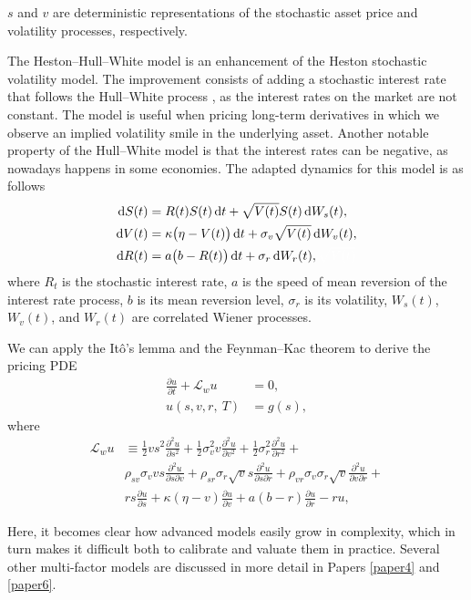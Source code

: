 \documentclass{UUThesisTemplate}
\begin{document}
$s$ and $v$ are deterministic representations of the stochastic asset price and volatility processes, respectively.
\par The Heston--Hull--White model is an enhancement of the Heston stochastic volatility model. The improvement consists of adding a stochastic interest rate that follows the Hull--White process \cite{hull1990pricing}, as the interest rates on the market are not constant. The model is useful when pricing long-term derivatives in which we observe an implied volatility smile in the underlying asset. Another notable property of the Hull--White model is that the interest rates can be negative, as nowadays happens in some economies. The adapted dynamics for this model is as follows
\begin{align}
\dif S(t) & =  R(t)S(t)\dif t + \sqrt{V(t)}S(t)\dif W_s(t), \label{hhwSDE1} \\
\dif V(t) & =  \kappa\big(\eta-V(t)\big)\dif t + \sigma_v \sqrt{V(t)}\dif W_v(t), \label{hhwSDE2} \\
\dif R(t) & = a\big(b-R(t)\big)\dif t + \sigma_r\dif W_r(t), {\color{white} \sqrt{V(t)}} \label{hhwSDE3}
\end{align}
where $R_t$ is the stochastic interest rate, $a$ is the speed of mean reversion of the interest rate process, $b$ is its mean reversion level, $\sigma_r$ is its volatility,  $W_s(t)$, $W_v(t)$,  and $W_r(t)$ are correlated Wiener processes.
\par We can apply the It\^{o}'s lemma and the Feynman--Kac theorem to derive the pricing PDE
\begin{align}
\frac{\partial u}{\partial t}+\mathcal{L}_w u&=0, \nonumber \\
u(s,v,r,\ T) &= g(s), \label{hhwPDE}
\end{align}
where
\begin{align}
\mathcal{L}_{w} u &\equiv  \frac{1}{2}vs^2\frac{\partial^2 u}{\partial s^2} + \frac{1}{2}\sigma_v^2v\frac{\partial^2 u}{\partial v^2}  + \frac{1}{2}\sigma_r^2\frac{\partial^2 u}{\partial r^2} + \nonumber \\
                             & \rho_{sv}\sigma_v vs\frac{\partial^2 u}{\partial s\partial v} + \rho_{sr}\sigma_r \sqrt{v} s\frac{\partial^2 u}{\partial s\partial r} + \rho_{vr}\sigma_v\sigma_r \sqrt{v}\frac{\partial^2 u}{\partial v\partial r} + \nonumber \\
                             & rs\frac{\partial u}{\partial s} + \kappa(\eta-v)\frac{\partial u}{\partial v} + a(b-r)\frac{\partial u}{\partial r} - ru, \label{eqHHWop}
\end{align}
\par Here, it becomes clear how advanced models easily grow in complexity, which in turn makes it difficult both to calibrate and valuate them in practice. Several other multi-factor models are discussed in more detail in Papers \ref{paper4} and \ref{paper6}. 
%
\end{document}
